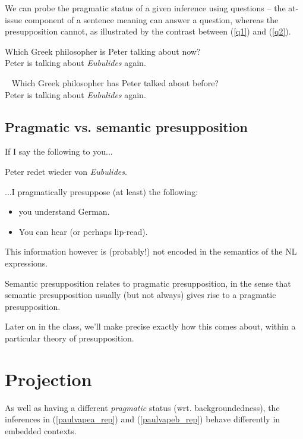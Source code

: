 \documentclass[cronos,landscape,paper=letter]{ling-handout}
\begin{document}
We can probe the pragmatic status of a given inference using questions -- the at-issue component of a sentence meaning can answer a question, whereas the presupposition cannot, as illustrated by the contrast between (\ref{q1}) and (\ref{q2}).

\ex\label{q1}
Which Greek philosopher is Peter talking about now?\\
\ljudge{\cmark} Peter is talking about \textit{Eubulides} again.
\xe

\ex~\label{q2}
Which Greek philosopher has Peter talked about before?\\
\ljudge{\#}Peter is talking about \textit{Eubulides} again.
\xe

\subsection{Pragmatic vs. semantic presupposition}

If I say the following to you...

\ex
Peter redet wieder von \textit{Eubulides}.
\xe

...I pragmatically presuppose (at least) the following:

\begin{itemize}

  \item you understand German.

  \item You can hear (or perhaps lip-read).

\end{itemize}

This information however is (probably!) not encoded in the semantics of the NL expressions.

Semantic presupposition relates to pragmatic presupposition, in the sense that semantic presupposition usually (but not always) gives rise to a pragmatic presupposition.

Later on in the class, we'll make precise exactly how this comes about, within a particular theory of presupposition.

\section{Projection}

As well as having a different \textit{pragmatic} status (wrt. backgroundedness), the inferences in (\ref{paulvapea_rep}) and (\ref{paulvapeb_rep}) behave differently in embedded contexts.
\end{document}
